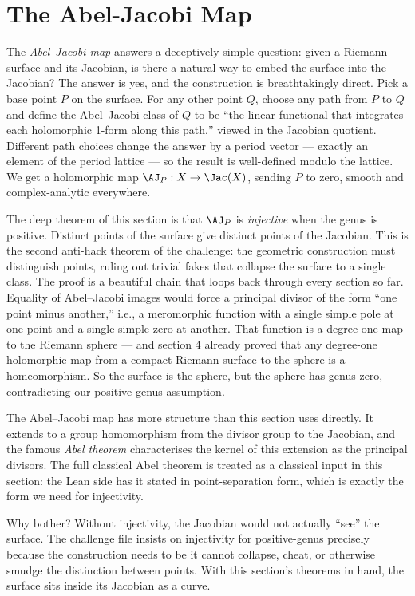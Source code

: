 \section{The Abel-Jacobi Map}
\label{sec:abel-jacobi}

\begin{layman}
The \emph{Abel--Jacobi map} answers a deceptively simple question:
given a Riemann surface and its Jacobian, is there a natural way to
embed the surface into the Jacobian? The answer is yes, and the
construction is breathtakingly direct. Pick a base point \(P\) on
the surface. For any other point \(Q\), choose any path from \(P\)
to \(Q\) and define the Abel--Jacobi class of \(Q\) to be ``the
linear functional that integrates each holomorphic 1-form along
this path,'' viewed in the Jacobian quotient. Different path
choices change the answer by a period vector --- exactly an element
of the period lattice --- so the result is well-defined modulo the
lattice. We get a holomorphic map
\(\AJ_P : X \to \Jac(X)\),
sending \(P\) to zero, smooth and complex-analytic everywhere.

The deep theorem of this section is that \(\AJ_P\) is
\emph{injective} when the genus is positive. Distinct points of the
surface give distinct points of the Jacobian. This is the second
anti-hack theorem of the challenge: the geometric
construction must distinguish points, ruling out trivial fakes that
collapse the surface to a single class. The proof is a beautiful
chain that loops back through every section so far. Equality of
Abel--Jacobi images would force a principal divisor of the form
``one point minus another,'' i.e., a meromorphic function with a
single simple pole at one point and a single simple zero at another.
That function is a degree-one map to the Riemann sphere --- and
section 4 already proved that any degree-one holomorphic map from a
compact Riemann surface to the sphere is a homeomorphism. So the
surface is the sphere, but the sphere has genus zero, contradicting
our positive-genus assumption.

The Abel--Jacobi map has more structure than this section uses
directly. It extends to a group homomorphism from the divisor group
to the Jacobian, and the famous \emph{Abel theorem} characterises
the kernel of this extension as the principal divisors. The full
classical Abel theorem is treated as a classical input in this
section: the Lean side has it stated in point-separation form,
which is exactly the form we need for injectivity.

Why bother? Without injectivity, the Jacobian would not actually
``see'' the surface. The challenge file insists on injectivity for
positive-genus precisely because the construction needs to be
it cannot collapse, cheat, or otherwise smudge the
distinction between points. With this section's theorems in hand,
the surface sits inside its Jacobian as a curve.
\end{layman}

